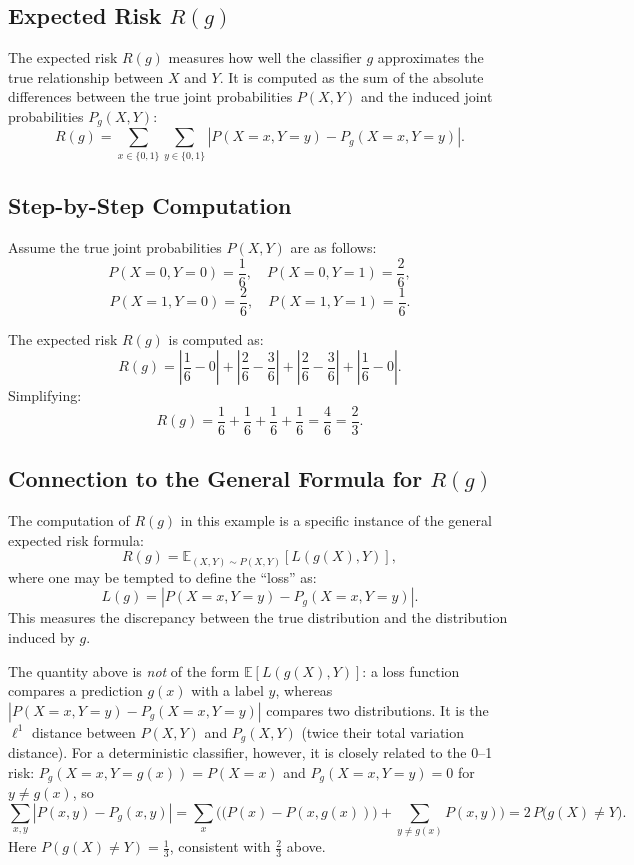 \begin{notechapter}
\subsection{Expected Risk \( R(g) \)}
The expected risk \( R(g) \) measures how well the classifier \( g \) approximates the true relationship between \( X \) and \( Y \). It is computed as the sum of the absolute differences between the true joint probabilities \( P(X, Y) \) and the induced joint probabilities \( P_g(X, Y) \):
\[
R(g) = \sum_{x \in \{0,1\}} \sum_{y \in \{0,1\}} \left| P(X = x, Y = y) - P_g(X = x, Y = y) \right|.
\]

\subsection{Step-by-Step Computation}
Assume the true joint probabilities \( P(X, Y) \) are as follows:
\[
P(X = 0, Y = 0) = \frac{1}{6}, \quad P(X = 0, Y = 1) = \frac{2}{6},
\]
\[
P(X = 1, Y = 0) = \frac{2}{6}, \quad P(X = 1, Y = 1) = \frac{1}{6}.
\]

The expected risk \( R(g) \) is computed as:
\[
R(g) = \left| \frac{1}{6} - 0 \right| + \left| \frac{2}{6} - \frac{3}{6} \right| + \left| \frac{2}{6} - \frac{3}{6} \right| + \left| \frac{1}{6} - 0 \right|.
\]
Simplifying:
\[
R(g) = \frac{1}{6} + \frac{1}{6} + \frac{1}{6} + \frac{1}{6} = \frac{4}{6} = \frac{2}{3}.
\]

\subsection{Connection to the General Formula for \( R(g) \)}
The computation of \( R(g) \) in this example is a specific instance of the general expected risk formula:
\[
R(g) = \mathbb{E}_{(X,Y) \sim P(X,Y)}[L(g(X), Y)],
\]
where one may be tempted to define the ``loss'' as:
\[
L(g) = \left| P(X = x, Y = y) - P_g(X = x, Y = y) \right|.
\]
This measures the discrepancy between the true distribution and the distribution induced by \( g \).

\begin{remark}
The quantity above is \emph{not} of the form \( \mathbb{E}[L(g(X), Y)] \): a loss function compares a
prediction \( g(x) \) with a label \( y \), whereas \( |P(X = x, Y = y) - P_g(X = x, Y = y)| \) compares two
distributions. It is the \( \ell^1 \) distance between \( P(X,Y) \) and \( P_g(X,Y) \) (twice their total
variation distance). For a deterministic classifier, however, it is closely related to the 0--1 risk:
\( P_g(X = x, Y = g(x)) = P(X = x) \) and \( P_g(X = x, Y = y) = 0 \) for \( y \neq g(x) \), so
\[
\sum_{x,y} \left| P(x, y) - P_g(x, y) \right|
= \sum_x \Big( \big(P(x) - P(x, g(x))\big) + \sum_{y \neq g(x)} P(x, y) \Big)
= 2\, P\big(g(X) \neq Y\big).
\]
Here \( P(g(X)\neq Y) = \frac{1}{3} \), consistent with \( \frac{2}{3} \) above.
\end{remark}


\end{notechapter}
